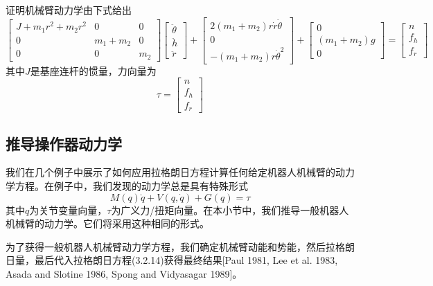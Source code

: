 \documentclass[12pt,a4paper]{ctexart}
\begin{document}
证明机械臂动力学由下式给出
\begin{equation}
\begin{bmatrix} J+m_1r^2+m_2r^2 & 0 & 0 \\ 0 & m_1+m_2 & 0 \\ 0 & 0 & m_2 \end{bmatrix} \begin{bmatrix} \ddot{\theta} \\ \ddot{h} \\ \ddot{r} \end{bmatrix} + \begin{bmatrix} 2(m_1+m_2)r\dot{r}\dot{\theta} \\ 0 \\ -(m_1+m_2)r\dot{\theta}^2 \end{bmatrix} + \begin{bmatrix} 0 \\ (m_1+m_2)g \\ 0 \end{bmatrix} = \begin{bmatrix} n \\ f_h \\ f_r \end{bmatrix}
\end{equation}
其中$J$是基座连杆的惯量，力向量为
\begin{equation}
\tau = \begin{bmatrix} n \\ f_h \\
 f_r \end{bmatrix}
\end{equation}

\subsection{推导操作器动力学}

我们在几个例子中展示了如何应用拉格朗日方程计算任何给定机器人机械臂的动力学方程。在例子中，我们发现的动力学总是具有特殊形式
\begin{equation}
M(q)\ddot{q} + V(q,\dot{q}) + G(q) = \tau
\end{equation}
其中$q$为关节变量向量，$\tau$为广义力/扭矩向量。在本小节中，我们推导一般机器人机械臂的动力学。它们将采用这种相同的形式。

为了获得一般机器人机械臂动力学方程，我们确定机械臂动能和势能，然后拉格朗日量，最后代入拉格朗日方程(3.2.14)获得最终结果[Paul 1981, Lee et al. 1983, Asada and Slotine 1986, Spong and Vidyasagar 1989]。
\end{document}
